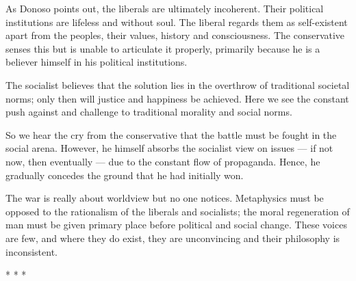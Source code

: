 As Donoso points out, the liberals are ultimately incoherent. Their political institutions are lifeless and without soul. The liberal regards them as self-existent apart from the peoples, their values, history and consciousness. The conservative senses this but is unable to articulate it properly, primarily because he is a believer himself in his political institutions.

The socialist believes that the solution lies in the overthrow of traditional societal norms; only then will justice and happiness be achieved. Here we see the constant push against and challenge to traditional morality and social norms.

So we hear the cry from the conservative that the battle must be fought in the social arena. However, he himself absorbs the socialist view on issues --- if not now, then eventually --- due to the constant flow of propaganda. Hence, he gradually concedes the ground that he had initially won.

The war is really about worldview but no one notices. Metaphysics must be opposed to the rationalism of the liberals and socialists; the moral regeneration of man must be given primary place before political and social change. These voices are few, and where they do exist, they are unconvincing and their philosophy is inconsistent.



\begin{center}* * *\end{center}

